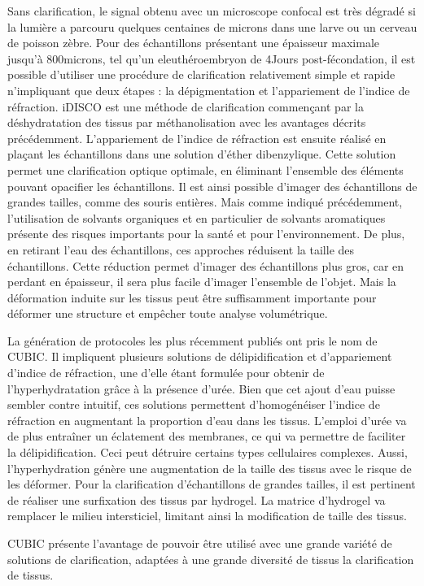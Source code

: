 \documentclass[\main/main.tex]{subfiles}
\begin{document}
Sans clarification, le signal obtenu avec un microscope confocal est très dégradé si la lumière a parcouru quelques centaines de microns dans une larve ou un cerveau de poisson zèbre.
Pour des échantillons présentant une épaisseur maximale jusqu'à 800microns, tel qu'un eleuthéroembryon de 4Jours post-fécondation, il est possible d'utiliser une procédure de clarification relativement simple et rapide n'impliquant que deux étapes : la dépigmentation et l'appariement de l'indice de réfraction\cite{affaticati_2018}.
iDISCO\cite{renier_2014} est une méthode de clarification commençant par la déshydratation des tissus par méthanolisation avec les avantages décrits précédemment. 
%
L'appariement de l'indice de réfraction est ensuite réalisé en plaçant les échantillons dans une solution d'éther dibenzylique.
%
Cette solution permet une clarification optique optimale, en éliminant l'ensemble des éléments pouvant opacifier les échantillons.
%
Il est ainsi possible d'imager des échantillons de grandes tailles, comme des souris entières.
Mais comme indiqué précédemment, l'utilisation de solvants organiques et en particulier de solvants aromatiques présente des risques importants pour la santé et pour l'environnement.
%
De plus, en retirant l'eau des échantillons, ces approches réduisent la taille des échantillons\cite{frtaud_2017}.
%
Cette réduction permet d'imager des échantillons plus gros, car en perdant en épaisseur, il sera plus facile d'imager l'ensemble de l'objet.
%
Mais la déformation induite sur les tissus peut être suffisamment importante pour déformer une structure et empêcher toute analyse volumétrique.


La génération de protocoles les plus récemment publiés ont pris le nom de CUBIC\cite{susaki_2014,susaki_2015}.
%
Il impliquent plusieurs solutions de délipidification et d'appariement d'indice de réfraction, une d'elle étant formulée pour obtenir de l'hyperhydratation grâce à la présence d'urée. Bien que cet ajout d'eau puisse sembler contre intuitif, ces solutions permettent d'homogénéiser l'indice de réfraction en augmentant la proportion d'eau dans les tissus.
L'emploi d'urée va de plus entraîner un éclatement des membranes, ce qui va permettre de faciliter la délipidification. Ceci peut détruire certains types cellulaires complexes. Aussi, l'hyperhydration génère une augmentation de la taille des tissus\cite{frtaud_2017} avec le risque de les déformer.
%
Pour la clarification d'échantillons de grandes tailles, il est pertinent de réaliser une surfixation des tissus par hydrogel\cite{chung_2013,richardson_2020}.
%
La matrice d'hydrogel va remplacer le milieu intersticiel, limitant ainsi la modification de taille des tissus\cite{frtaud_2017}.

%
CUBIC présente l'avantage de pouvoir être utilisé avec une grande variété de solutions de clarification, adaptées à une grande diversité de tissus la clarification de tissus.
%
\end{document}
